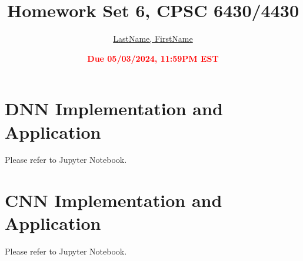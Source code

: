 \documentclass[11pt]{article}
\title{{\bf Homework Set 6, CPSC 6430/4430}}
\author{\Large\underline{LastName, FirstName}}
\date{\textbf{\Large\textcolor{red}{Due 05/03/2024, 11:59PM EST}}}
\newcommand{\R}{\mathbb{R}}
\newcommand{\minimize}{\operatorname*{minimize\ }}
\newcommand{\mtx}[1]{\mathbf{#1}}
\newcommand{\vct}[1]{\mathbf{#1}}
\def \mA {\mtx{A}}
\def \mI {\mtx{I}}
\def \mU {\mtx{U}}
\def \mX {\mtx{X}}
\def \mZ {\mtx{Z}}
\def \vv {\vct{v}}
\def \vx {\vct{x}}
\def \vy {\vct{y}}
\def \R {\mathbb{R}}
\begin{document}
\maketitle

\section*{DNN Implementation and Application}
Please refer to Jupyter Notebook.
\newpage
\section*{CNN Implementation and Application}
Please refer to Jupyter Notebook.
\end{document}
